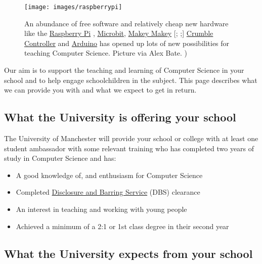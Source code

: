 \documentclass[
  12pt,
]{book}
\providecommand{\tightlist}{%
  \setlength{\itemsep}{0pt}\setlength{\parskip}{0pt}}
\begin{document}
\begin{figure}

{\centering \texttt{[image: images/raspberrypi]} 

}

\caption{An abundance of free software and relatively cheap new hardware like the \href{https://www.raspberrypi.org}{Raspberry Pi} \citep{raspberrypi}, \href{https://microbit.org}{Microbit}, \citep{Sentance2017} \href{https://makeymakey.com}{Makey Makey} {[}\citet{nevertooold}; \citet{makeymakey};{]} \href{https://redfernelectronics.co.uk/crumble/}{Crumble Controller} and \href{https://www.arduino.cc}{Arduino} \citep{arduino} has opened up lots of new possibilities for teaching Computer Science. Picture via Alex Bate. \citep{SnazzyRPi})}\label{fig:unnamed-chunk-7}
\end{figure}

Our aim is to support the teaching and learning of Computer Science in your school and to help engage schoolchildren in the subject. This page describes what we can provide you with and what we expect to get in return.

\hypertarget{what-the-university-is-offering-your-school}{%
\subsection{What the University is offering your school}\label{what-the-university-is-offering-your-school}}

The University of Manchester will provide your school or college with at least one student ambassador with some relevant training who has completed two years of study in Computer Science and has:

\begin{itemize}
\tightlist
\item
  A good knowledge of, and enthusiasm for Computer Science
\item
  Completed \href{https://www.gov.uk/government/organisations/disclosure-and-barring-service}{Disclosure and Barring Service} (DBS) clearance
\item
  An interest in teaching and working with young people
\item
  Achieved a minimum of a 2:1 or 1st class degree in their second year
\end{itemize}

\hypertarget{what-the-university-expects-from-your-school}{%
\subsection{What the University expects from your school}\label{what-the-university-expects-from-your-school}}
\end{document}

